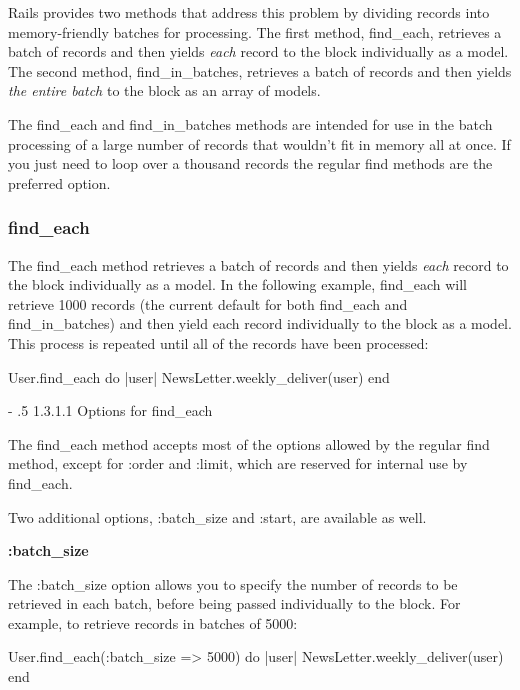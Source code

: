 \documentclass[10pt]{book}
\makeatletter
\renewcommand\paragraph{%
   \@startsection{paragraph}{4}{0mm}%
      {-\baselineskip}%
      {.5\baselineskip}%
      {\normalfont\scriptsize\bfseries}}
\newenvironment{code}{%
  \scriptsize
    \verbatim
}{%
    \endverbatim
    \newline
}
\makeatother
\begin{document}
Rails provides two methods that address this problem by dividing  records into memory-friendly batches for processing. The first method, find\_each, retrieves a batch of records and then yields \emph{each} record to the block individually as a model. The second method, find\_in\_batches, retrieves a batch of records and then yields \emph{the entire batch} to the block as an array of models.

The find\_each and find\_in\_batches  methods are intended for use in the batch processing of a large number  of records that wouldn’t fit in memory all at once. If you just need to  loop over a thousand records the regular find methods are the preferred  option.

\subsubsection{ find\_each}

The find\_each method retrieves a batch of records and then yields \emph{each} record to the block individually as a model. In the following example, find\_each will retrieve 1000 records (the current default for both find\_each and find\_in\_batches)  and then yield each record individually to the block as a model. This  process is repeated until all of the records have been processed:
\begin{code}
User.find_each do |user|
  NewsLetter.weekly_deliver(user)
end
\end{code}

\paragraph{1.3.1.1 Options for find\_each}

The find\_each method accepts most of the options allowed by the regular find method, except for :order and :limit, which are reserved for internal use by find\_each.

Two additional options, :batch\_size and :start, are available as well.

\textbf{:batch\_size}

The :batch\_size option allows you to specify the number of  records to be retrieved in each batch, before being passed individually  to the block. For example, to retrieve records in batches of 5000:
\begin{code}
User.find_each(:batch_size => 5000) do |user|
  NewsLetter.weekly_deliver(user)
end
\end{code}
\end{document}
